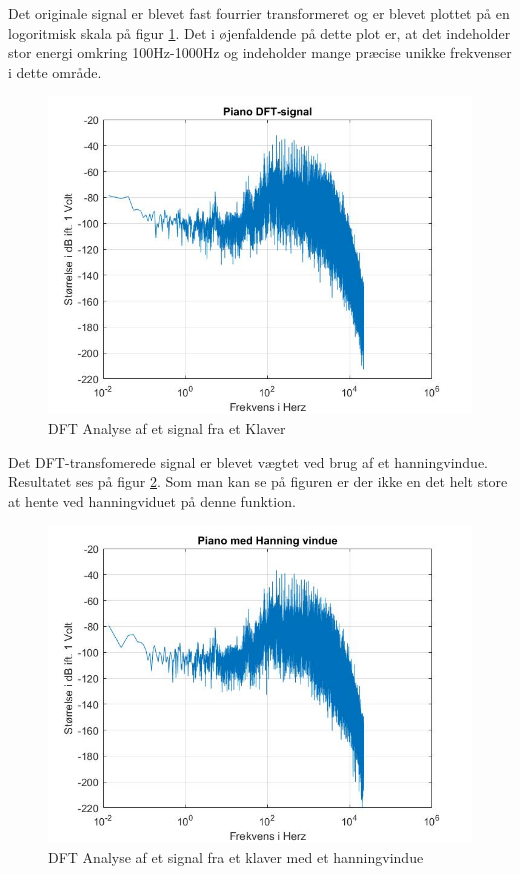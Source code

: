 Det originale signal er blevet fast fourrier transformeret og er blevet plottet på en logoritmisk skala på figur \ref{fig:Klaver DFT}. Det i øjenfaldende på dette plot er, at det indeholder stor energi omkring 100Hz-1000Hz og indeholder mange præcise unikke frekvenser i dette område. 
\begin{figure}[H]
	\centering
	\includegraphics[width=140mm]{figures/Piano/DFT.jpg}
	\caption{DFT Analyse af et signal fra et Klaver}
	\label{fig:Klaver DFT}
\end{figure}

Det DFT-transfomerede signal er blevet vægtet ved brug af et hanningvindue. Resultatet ses på figur \ref{fig:Klaver hanning}. Som man kan se på figuren er der ikke en det helt store at hente ved hanningviduet på denne funktion.
\begin{figure}[H]
	\centering
	\includegraphics[width=140mm]{figures/Piano/hanning.jpg}
	\caption{DFT Analyse af et signal fra et klaver med et hanningvindue}
	\label{fig:Klaver hanning}
\end{figure}

